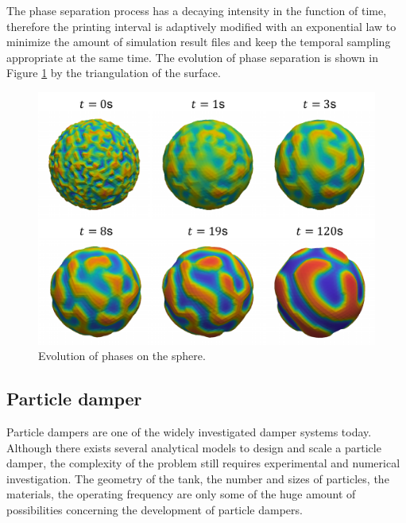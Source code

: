 \documentclass[a4paper,12pt,openany]{book}
\theoremstyle{break}
\begin{document}
The phase separation process has a decaying intensity in the function of time, therefore the printing interval is adaptively modified with an exponential law to minimize the amount of simulation result files and keep the temporal sampling appropriate at the same time. The evolution of phase separation is shown in Figure \ref{fig:cahnhilliard_result} by the triangulation of the surface.
\begin{figure}[H]
  \includegraphics[scale=0.6]{cahnhilliard_result.pdf}
  \centering
  \caption{Evolution of phases on the sphere.}
  \label{fig:cahnhilliard_result}
\end{figure}\vspace*{3pt}


\subsection{Particle damper}
Particle dampers are one of the widely investigated damper systems today. Although there exists several analytical models to design and scale a particle damper, the complexity of the problem still requires experimental and numerical investigation. The geometry of the tank, the number and sizes of particles, the materials, the operating frequency are only some of the huge amount of possibilities concerning the development of particle dampers.
\end{document}

